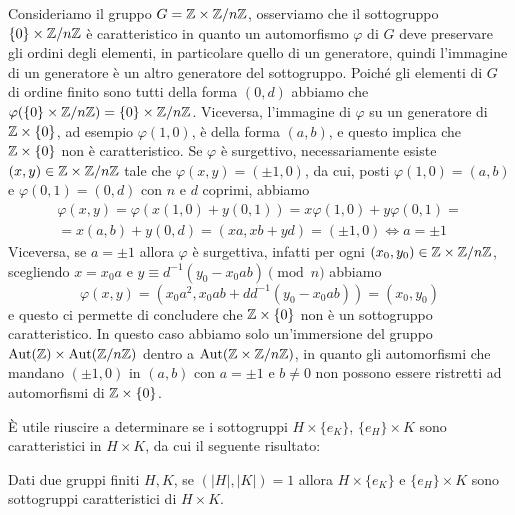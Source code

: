 \documentclass[11pt]{scrartcl}
\begin{document}
\begin{example}
    Consideriamo il gruppo $G = \mathbb Z \times {\mathbb Z}/n{\mathbb Z}$, osserviamo che il sottogruppo 
    $\{0\}\times {\mathbb Z}/n{\mathbb Z}$ è caratteristico in quanto un automorfismo $\varphi$ di $G$ deve
    preservare gli ordini degli elementi, in particolare quello di un generatore,
    quindi l'immagine di un generatore è un altro generatore del sottogruppo.
    Poiché gli elementi di $G$ di ordine finito sono tutti della forma $(0, d)$
    abbiamo che $\varphi(\{0\}\times{\mathbb Z}/n{\mathbb Z}) = \{0\}\times{\mathbb Z}/n{\mathbb Z}$. Viceversa, l'immagine
    di $\varphi$ su un generatore di $\mathbb Z\times\{0\}$, ad esempio 
    $\varphi(1, 0)$, è della forma $(a, b)$,
    e questo implica che $\mathbb Z\times \{0\}$ non è caratteristico. Se $\varphi$ è
    surgettivo, necessariamente esiste $(x, y) \in \mathbb Z\times {\mathbb Z}/n{\mathbb Z}$ tale che
    $\varphi(x, y) = (\pm 1, 0)$, da cui, posti $\varphi(1, 0) = (a, b)$ e
    $\varphi(0, 1) = (0, d)$ con $n$ e $d$ coprimi, abbiamo
    \begin{multline*}
        \varphi(x, y) = \varphi(x(1, 0) + y(0, 1)) = x\varphi(1, 0) + y\varphi(0, 1) = \\
        = x(a, b) + y(0, d) = (xa, xb + yd) = (\pm 1, 0) \iff a = \pm 1
    \end{multline*}
    Viceversa, se $a = \pm 1$ allora $\varphi$ è surgettiva, infatti 
    per ogni $(x_0, y_0) \in \mathbb Z\times{\mathbb Z}/n{\mathbb Z}$, scegliendo
    $x = x_0a$ e $y \equiv d^{-1}(y_0 - x_0ab)\pmod n$ abbiamo \[
        \varphi(x, y) = (x_0a^2, x_0ab + d d^{-1}(y_0 - x_0ab)) = (x_0, y_0)
    \]e questo ci permette di concludere che $\mathbb Z\times\{0\}$ non è un sottogruppo
    caratteristico. In questo caso abbiamo solo un'immersione del gruppo
    $\operatorname{Aut}(\mathbb Z) \times \operatorname{Aut}({\mathbb Z}/n{\mathbb Z})$ dentro a $\operatorname{Aut}(\mathbb Z\times {\mathbb Z}/n{\mathbb Z})$, in quanto 
    gli automorfismi che mandano $(\pm 1, 0)$ in $(a, b)$ con $a = \pm 1$ e 
    $b \neq 0$ non possono essere ristretti ad automorfismi di $\mathbb Z\times \{0\}$.
\end{example}

È utile riuscire a determinare se i sottogruppi $H\times\{e_K\}$, $\{e_H\}\times K$
sono caratteristici in $H\times K$, da cui il seguente risultato:

\begin{proposition}
    Dati due gruppi finiti $H, K$, se $(|H|, |K|) = 1$ allora $H\times\{e_K\}$
    e $\{e_H\}\times K$ sono sottogruppi caratteristici di $H\times K$.
\end{proposition}
\end{document}
